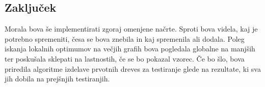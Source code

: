 \documentclass[a4paper, 12 pt]{article}
\begin{document}
\subsection{Zaključek}

Morala bova še implementirati zgoraj omenjene načrte. Sproti bova videla, kaj je potrebno spremeniti, česa se bova znebila in kaj spremenila ali dodala. Poleg iskanja lokalnih optimumov na večjih grafih bova pogledala globalne na manjših ter poskušala sklepati na lastnostih, če se bo pokazal vzorec. Če bo šlo, bova priredila algoritme izdelave prvotnih dreves za testiranje glede na rezultate, ki sva jih dobila na prejšnjih testiranjih.
\end{document}
